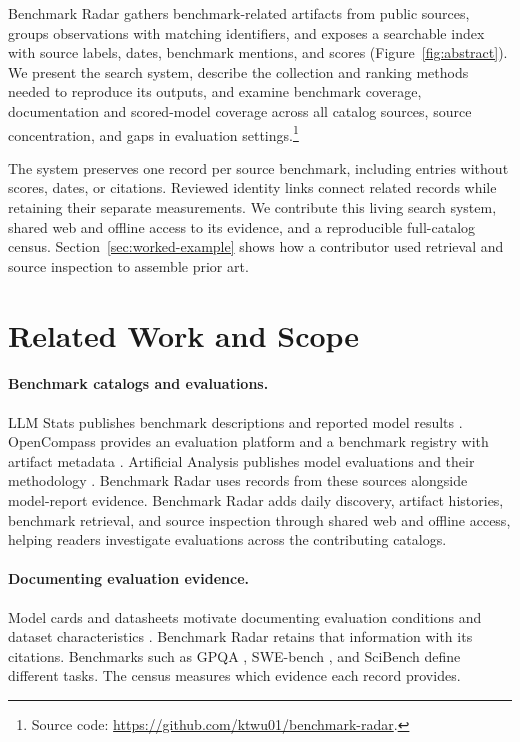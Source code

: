 \documentclass[11pt]{article}
\begin{document}
Benchmark Radar gathers benchmark-related artifacts from public sources, groups observations with matching identifiers, and exposes a searchable index with source labels, dates, benchmark mentions, and scores (Figure~\ref{fig:abstract}). We present the search system, describe the collection and ranking methods needed to reproduce its outputs, and examine benchmark coverage, documentation and scored-model coverage across all catalog sources, source concentration, and gaps in evaluation settings.\footnote{Source code: \url{https://github.com/ktwu01/benchmark-radar}.}

The system preserves one record per source benchmark, including entries without scores, dates, or citations. Reviewed identity links connect related records while retaining their separate measurements. We contribute this living search system, shared web and offline access to its evidence, and a reproducible full-catalog census. Section~\ref{sec:worked-example} shows how a contributor used retrieval and source inspection to assemble prior art.

\section{Related Work and Scope}
\label{sec:related-work}

\paragraph{Benchmark catalogs and evaluations.}
LLM Stats publishes benchmark descriptions and reported model results \citep{llmstats2026benchmarks}. OpenCompass provides an evaluation platform and a benchmark registry with artifact metadata \citep{opencompass2026datasetstatistics}. Artificial Analysis publishes model evaluations and their methodology \citep{artificialanalysis2026methodology}. Benchmark Radar uses records from these sources alongside model-report evidence. Benchmark Radar adds daily discovery, artifact histories, benchmark retrieval, and source inspection through shared web and offline access, helping readers investigate evaluations across the contributing catalogs.

\paragraph{Documenting evaluation evidence.}
Model cards and datasheets motivate documenting evaluation conditions and dataset characteristics \citep{mitchell2019modelcards,gebru2021datasheets}. Benchmark Radar retains that information with its citations. Benchmarks such as GPQA \citep{rein2023gpqa}, SWE-bench \citep{jimenez2023swebench}, and SciBench \citep{wang2023scibench} define different tasks. The census measures which evidence each record provides.
\end{document}
